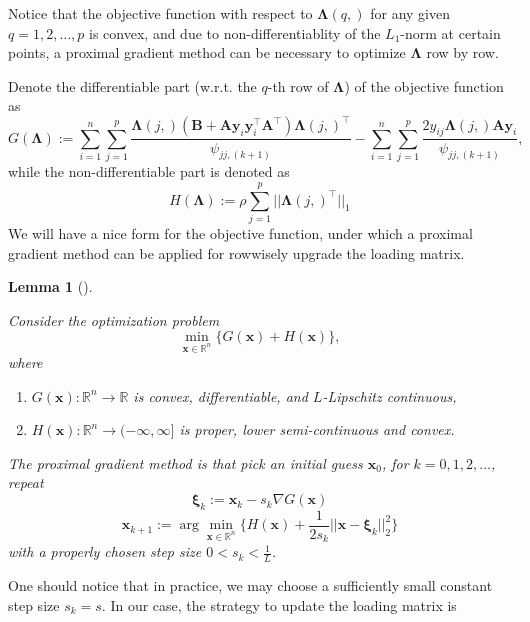 \documentclass[
  a4paper,
  oneside,
  openany,
  12pt,
  onecolumn,
  twoside]{book}
\providecommand{\tightlist}{%
  \setlength{\itemsep}{0pt}\setlength{\parskip}{0pt}}\usepackage{longtable,booktabs,array}
\theoremstyle{plain}
\newtheorem{lemma}{Lemma}[chapter]
\theoremstyle{remark}
\begin{document}
Notice that the objective function with respect to
\(\boldsymbol{\Lambda}(q,)\) for any given \(q=1,2,\dots,p\) is convex,
and due to non-differentiablity of the \(L_1\)-norm at certain points, a
proximal gradient method can be necessary to optimize
\(\boldsymbol{\Lambda}\) row by row.

Denote the differentiable part (w.r.t. the \(q\)-th row of
\(\boldsymbol{\Lambda}\)) of the objective function as \[
G(\boldsymbol{\Lambda}):= \sum_{i=1}^n\sum_{j=1}^p\frac{\boldsymbol{\Lambda}(j,)(\boldsymbol{B}+\boldsymbol{A}\boldsymbol{y}_i\boldsymbol{y}_i^\top\boldsymbol{A}^\top)\boldsymbol{\Lambda}(j,)^\top}{\psi_{jj,(k+1)}} -\sum_{i=1}^n \sum_{j=1}^p \frac{2y_{ij}\boldsymbol{\Lambda}(j,)\boldsymbol{A}\boldsymbol{y}_i}{\psi_{jj,(k+1)}},
\] while the non-differentiable part is denoted as \[
H(\boldsymbol{\Lambda}) := \rho \sum_{j=1}^p||\boldsymbol{\Lambda}(j,)^\top||_1
\] We will have a nice form for the objective function, under which a
proximal gradient method can be applied for rowwisely upgrade the
loading matrix.

\begin{lemma}[]\protect\hypertarget{lem-proximalmethod}{}\label{lem-proximalmethod}

Consider the optimization problem \[
\min_{\boldsymbol{x}\in\mathbb{R}^n}\{G(\boldsymbol{x})+H(\boldsymbol{x})\},
\] where

\begin{enumerate}
\def\labelenumi{\arabic{enumi}.}
\tightlist
\item
  \(G(\boldsymbol{x}): \mathbb{R}^n \to \mathbb{R}\) is convex,
  differentiable, and \(L\)-Lipschitz continuous,
\item
  \(H(\boldsymbol{x}): \mathbb{R}^n \to (-\infty,\infty]\) is proper,
  lower semi-continuous and convex.
\end{enumerate}

The proximal gradient method is that pick an initial guess
\(\boldsymbol{x}_0\), for \(k=0,1,2,\dots\), repeat \[
\boldsymbol{\xi}_k := \boldsymbol{x}_k - s_k \nabla G(\boldsymbol{x})
\] \[
\boldsymbol{x}_{k+1} := \arg \min_{\boldsymbol{x}\in\mathbb{R}^n}\{H(\boldsymbol{x})+\frac{1}{2s_k}||\boldsymbol{x}-\boldsymbol{\xi}_k||^2_2\}
\] with a properly chosen step size \(0<s_k<\frac{1}{L}\).

\end{lemma}

One should notice that in practice, we may choose a sufficiently small
constant step size \(s_k=s\). In our case, the strategy to update the
loading matrix is
\end{document}
